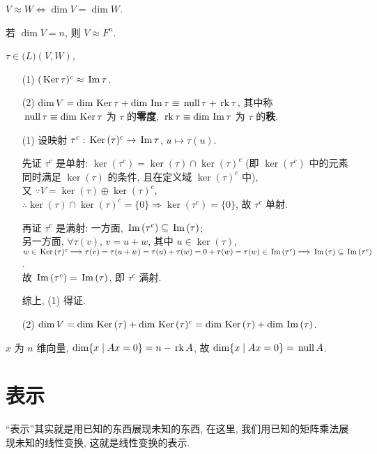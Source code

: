 \documentclass{note}
\begin{document}
\begin{thm}[(课本定理 2.6)]
    $V\approx W\Longleftrightarrow\dim V=\dim W$.
\end{thm}

\begin{thm}[(课本定理 2.7)]
    若 $\dim V=n$, 则 $V\approx F^n$.
\end{thm}

\begin{thm}[(课本定理 2.8)]
    $\tau\in\mathcal(L)(V,W)$,
    \begin{itemize}
        \item[(1)] $(\,\mathrm{Ker}\,\tau)^c\approx\,\mathrm{Im}\,\tau$.
        \item[(2)] $\dim V=\dim\,\mathrm{Ker}\,\tau+\dim\,\mathrm{Im}\,\tau\equiv\,\mathrm{null}\,\tau+\,\mathrm{rk}\,\tau$, 其中称 $\,\mathrm{null}\,\tau\equiv\dim\,\mathrm{Ker}\,\tau$ 为 $\tau$ 的\textbf{零度}, $\,\mathrm{rk}\,\tau\equiv\dim\,\mathrm{Im}\,\tau$ 为 $\tau$ 的\textbf{秩}.
    \end{itemize}
\end{thm}
\begin{pf}
    \begin{itemize}
        \item[(1)] 设映射 $\tau^c:\,\mathrm{Ker}\,(\tau)^c\rightarrow\,\mathrm{Im}\,\tau$, $u\mapsto\tau(u)$.

        先证 $\tau^c$ 是单射: $\ker(\tau^c)=\ker(\tau)\cap\ker(\tau)^c$ (即 $\ker(\tau^c)$ 中的元素同时满足 $\ker(\tau)$ 的条件, 且在定义域 $\ker(\tau)^c$ 中),\\
        又 $\because V=\ker(\tau)\oplus\ker(\tau)^c$, $\therefore\ker(\tau)\cap\ker(\tau)^c=\{0\}\Longrightarrow\ker(\tau^c)=\{0\}$, 故 $\tau^c$ 单射.

        再证 $\tau^c$ 是满射: 一方面, $\,\mathrm{Im}\,(\tau^c)\subseteq\,\mathrm{Im}\,(\tau)$;\\
        另一方面, $\forall\tau(v)$, $v=u+w$, 其中 $u\in\ker(\tau)$, $w\in\,\mathrm{Ker}\,(\tau)^c\Longrightarrow\tau(v)=\tau(u+w)=\tau(u)+\tau(w)=0+\tau(w)=\tau(w)\in\,\mathrm{Im}\,(\tau^c)\Longrightarrow\,\mathrm{Im}\,(\tau)\subseteq\,\mathrm{Im}\,(\tau^c)$.\\
        故 $\,\mathrm{Im}\,(\tau^c)=\,\mathrm{Im}\,(\tau)$, 即 $\tau^c$ 满射.

        综上, (1) 得证.
        \item[(2)] $\dim V=\dim\,\mathrm{Ker}\,(\tau)+\dim\,\mathrm{Ker}\,(\tau)^c=\dim\,\mathrm{Ker}\,(\tau)+\dim\,\mathrm{Im}\,(\tau)$.
    \end{itemize}
\end{pf}

$x$ 为 $n$ 维向量, $\dim\{x\mid Ax=0\}=n-\,\mathrm{rk}\, A$, 故 $\dim\{x\mid Ax=0\}=\,\mathrm{null}\, A$.

\section{表示}
``表示''其实就是用已知的东西展现未知的东西, 在这里, 我们用已知的矩阵乘法展现未知的线性变换, 这就是线性变换的表示.
\end{document}
